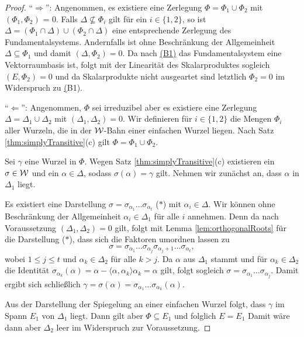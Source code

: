 \begin{proof}
  ``$\Rightarrow$'':
  Angenommen, es existiere eine Zerlegung $\Phi = \Phi_1 \cup \Phi_2$ mit $(\Phi_1, \Phi_2)$ = 0.
  Falls $\Delta \not\subseteq \Phi_i$ gilt für ein $i \in \{1,2\}$, so ist $\Delta = (\Phi_1 \cap \Delta) \cup (\Phi_2 \cap \Delta)$ eine entsprechende Zerlegung des Fundamentalsystems.
  Andernfalls ist ohne Beschränkung der Allgemeinheit $\Delta \subseteq \Phi_1$ und damit $(\Delta, \Phi_2) = 0$.
  Da nach \hyperref[it:B1]{(B1)} das Fundamentalsystem eine Vektorraumbasis ist, folgt mit der Linearität des Skalarproduktes sogleich $(E, \Phi_2) = 0$ und da Skalarprodukte nicht ausgeartet sind letztlich $\Phi_2 = {0}$ im Widerspruch zu \hyperref[it:B1](B1).

  ``$\Leftarrow$'':
  Angenommen, $\Phi$ sei irreduzibel aber es existiere eine Zerlegung $\Delta = \Delta_1 \cup \Delta_2$ mit $(\Delta_1, \Delta_2) = 0$.
  Wir definieren für $i \in \{1,2\}$ die Mengen $\Phi_i$ aller Wurzeln, die in der $\mathcal{W}$\hyp{}Bahn einer einfachen Wurzel liegen. 
  Nach Satz \ref{thm:simplyTransitive}(c) gilt $\Phi = \Phi_1 \cup \Phi_2$.

  Sei $\gamma$ eine Wurzel in $\Phi$.
  Wegen Satz \ref{thm:simplyTransitive}(c) existieren ein $\sigma \in \mathcal{W}$ und ein $\alpha \in \Delta$, sodass $\sigma(\alpha) = \gamma$ gilt.
  Nehmen wir zunächst an, dass $\alpha$ in $\Delta_1$ liegt.

  Es existiert eine Darstellung $\sigma = \sigma_{\alpha_1} \dots \sigma_{\alpha_t}$ ($\ast$) mit $\alpha_i \in \Delta$.
  Wir können ohne Beschränkung der Allgemeinheit $\alpha_i \in \Delta_1$ für alle $i$ annehmen.
  Denn da nach Voraussetzung $(\Delta_1, \Delta_2) = 0$ gilt, folgt mit Lemma \ref{lem:orthogonalRoots} für die Darstellung ($\ast$), dass sich die Faktoren umordnen lassen zu
  \begin{displaymath}
    \sigma = \sigma_{\alpha_1} \dots \sigma_{\alpha_j} \sigma_{\alpha_j+1} \dots \sigma_{\alpha_t},
  \end{displaymath}
  wobei $1 \leq j \leq t$ und $\alpha_k \in \Delta_2$ für alle $k > j$.
  Da $\alpha$ aus $\Delta_1$ stammt und für $\alpha_k \in \Delta_2$ die Identität $\sigma_{\alpha_k}(\alpha) = \alpha - \langle \alpha, \alpha_k \rangle \alpha_k = \alpha$ gilt, folgt sogleich $\sigma = \sigma_{\alpha_1} \dots \sigma_{\alpha_j}$. 
  Damit ergibt sich schließlich $\gamma = \sigma(\alpha) = \sigma_{\alpha_1} \dots \sigma_{\alpha_k}(\alpha)$.

  Aus der Darstellung der Spiegelung an einer einfachen Wurzel folgt, dass $\gamma$ im Spann $E_1$ von $\Delta_1$ liegt.
  Dann gilt aber $\Phi \subseteq E_1$ und folglich $E = E_1$
  Damit wäre dann aber $\Delta_2$ leer im Widerspruch zur Voraussetzung.
\end{proof}

